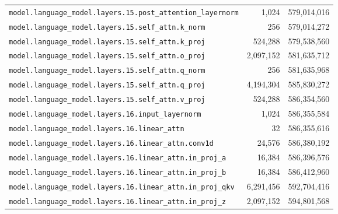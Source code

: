 \documentclass[10pt,a4paper]{article}
\theoremstyle{definition}
\begin{document}
\begin{appendices}
\begin{longtable}{p{9.5cm}rr}
\texttt{model.\allowbreak{}language\_model.\allowbreak{}layers.\allowbreak{}15.\allowbreak{}post\_attention\_layernorm} & 1,024 & 579,014,016 \\
\texttt{model.\allowbreak{}language\_model.\allowbreak{}layers.\allowbreak{}15.\allowbreak{}self\_attn.\allowbreak{}k\_norm} & 256 & 579,014,272 \\
\texttt{model.\allowbreak{}language\_model.\allowbreak{}layers.\allowbreak{}15.\allowbreak{}self\_attn.\allowbreak{}k\_proj} & 524,288 & 579,538,560 \\
\texttt{model.\allowbreak{}language\_model.\allowbreak{}layers.\allowbreak{}15.\allowbreak{}self\_attn.\allowbreak{}o\_proj} & 2,097,152 & 581,635,712 \\
\texttt{model.\allowbreak{}language\_model.\allowbreak{}layers.\allowbreak{}15.\allowbreak{}self\_attn.\allowbreak{}q\_norm} & 256 & 581,635,968 \\
\texttt{model.\allowbreak{}language\_model.\allowbreak{}layers.\allowbreak{}15.\allowbreak{}self\_attn.\allowbreak{}q\_proj} & 4,194,304 & 585,830,272 \\
\texttt{model.\allowbreak{}language\_model.\allowbreak{}layers.\allowbreak{}15.\allowbreak{}self\_attn.\allowbreak{}v\_proj} & 524,288 & 586,354,560 \\
\texttt{model.\allowbreak{}language\_model.\allowbreak{}layers.\allowbreak{}16.\allowbreak{}input\_layernorm} & 1,024 & 586,355,584 \\
\texttt{model.\allowbreak{}language\_model.\allowbreak{}layers.\allowbreak{}16.\allowbreak{}linear\_attn} & 32 & 586,355,616 \\
\texttt{model.\allowbreak{}language\_model.\allowbreak{}layers.\allowbreak{}16.\allowbreak{}linear\_attn.\allowbreak{}conv1d} & 24,576 & 586,380,192 \\
\texttt{model.\allowbreak{}language\_model.\allowbreak{}layers.\allowbreak{}16.\allowbreak{}linear\_attn.\allowbreak{}in\_proj\_a} & 16,384 & 586,396,576 \\
\texttt{model.\allowbreak{}language\_model.\allowbreak{}layers.\allowbreak{}16.\allowbreak{}linear\_attn.\allowbreak{}in\_proj\_b} & 16,384 & 586,412,960 \\
\texttt{model.\allowbreak{}language\_model.\allowbreak{}layers.\allowbreak{}16.\allowbreak{}linear\_attn.\allowbreak{}in\_proj\_qkv} & 6,291,456 & 592,704,416 \\
\texttt{model.\allowbreak{}language\_model.\allowbreak{}layers.\allowbreak{}16.\allowbreak{}linear\_attn.\allowbreak{}in\_proj\_z} & 2,097,152 & 594,801,568 \\

\end{longtable}
\end{appendices}
\end{document}
